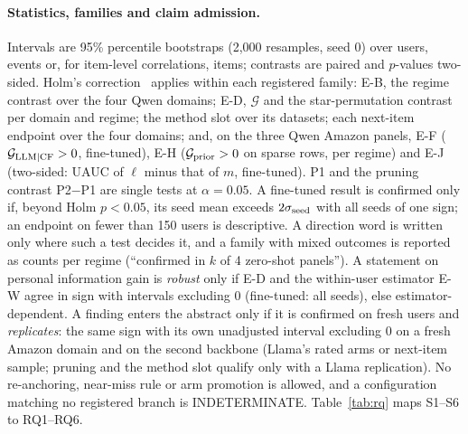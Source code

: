\paragraph{Statistics, families and claim admission.}
Intervals are 95\% percentile bootstraps (2,000 resamples, seed 0) over users, events or, for item-level correlations, items;
contrasts are paired and $p$-values two-sided. Holm's correction~\citep{holm1979simple} applies within each registered family: E-B, the
regime contrast over the four Qwen domains; E-D, $\mathcal G$ and the star-permutation contrast per domain and regime; the method slot
over its datasets; each next-item endpoint over the four domains; and, on the three Qwen Amazon panels, E-F ($\mathcal G_{\rm LLM|CF}>0$,
fine-tuned), E-H ($\mathcal G_{\rm prior}>0$ on sparse rows, per regime) and E-J (two-sided: UAUC of $\ell$ minus that of $m$,
fine-tuned). P1 and the pruning contrast P2$-$P1 are single tests at $\alpha=0.05$. A fine-tuned result is confirmed only if, beyond
Holm $p<0.05$, its seed mean exceeds $2\sigma_{\rm seed}$ with all seeds of one sign; an endpoint on fewer than 150 users is
descriptive. A direction word is written only where such a test decides it, and a family with mixed outcomes is reported as counts
per regime (``confirmed in $k$ of 4 zero-shot panels''). A statement on personal information gain is \emph{robust} only if E-D and
the within-user estimator E-W agree in sign with intervals excluding 0 (fine-tuned: all seeds), else estimator-dependent. A finding
enters the abstract only if it is confirmed on fresh users and \emph{replicates}: the same sign with its own unadjusted interval
excluding 0 on a fresh Amazon domain and on the second backbone (Llama's rated arms or next-item sample; pruning and the method slot
qualify only with a Llama replication). No re-anchoring, near-miss rule or arm promotion is allowed, and a configuration matching no
registered branch is INDETERMINATE. Table~\ref{tab:rq} maps S1--S6 to RQ1--RQ6.

